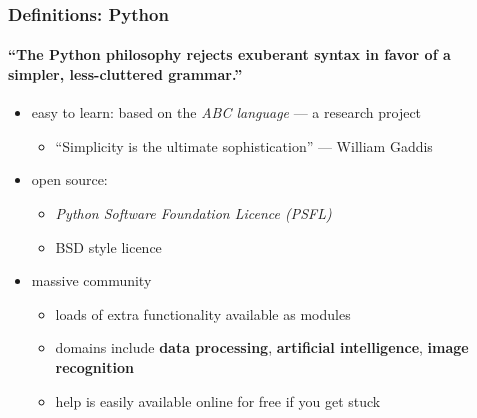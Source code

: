 \documentclass{beamer}
\begin{document}
    \begin{frame}
	    \frametitle{Definitions: Python}
	    \framesubtitle{``The Python philosophy rejects exuberant syntax in favor of a simpler, less-cluttered grammar.''}
	    \begin{itemize}
		    \item easy to learn: based on the \textit{ABC language} --- a research project 
			    \begin{itemize}
				    \item ``Simplicity is the ultimate sophistication'' \tiny{--- William Gaddis}
			    \end{itemize}
		    \item open source: 
			    \begin{itemize}
				    \item \textit{Python Software Foundation Licence (PSFL)} 
				    \item BSD style licence
			    \end{itemize}
		    \item massive community
			    \begin{itemize}
				    \item loads of extra functionality available as modules
				    \item domains include \textbf{data processing}, \textbf{artificial intelligence}, \textbf{image recognition}
				    \item help is easily available online for free if you get stuck
			    \end{itemize}
	    \end{itemize}
    \end{frame}

\end{document}

